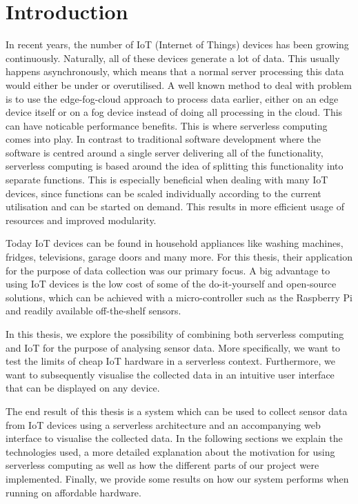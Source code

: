 \chapter{Introduction}
\label{sec:introduction}

In recent years, the number of IoT (Internet of Things) devices has been growing continuously.
Naturally, all of these devices generate a lot of data. This usually happens asynchronously, which
means that a normal server processing this data would either be under or overutilised. A well known
method to deal with problem is to use the edge-fog-cloud approach to process data earlier, either on
an edge device itself or on a fog device instead of doing all processing in the cloud. This can have
noticable performance benefits. This is where serverless computing comes into play. In contrast to
traditional software development where the software is centred around a single server delivering all
of the functionality, serverless computing is based around the idea of splitting this functionality
into separate functions. This is especially beneficial when dealing with many IoT devices, since
functions can be scaled individually according to the current utilisation and can be started on
demand. This results in more efficient usage of resources and improved modularity.

Today IoT devices can be found in household appliances like washing machines, fridges, televisions,
garage doors and many more. For this thesis, their application for the purpose of data collection
was our primary focus. A big advantage to using IoT devices is the low cost of some of the
do-it-yourself and open-source solutions, which can be achieved with a micro-controller such as the
Raspberry Pi and readily available off-the-shelf sensors.

In this thesis, we explore the possibility of combining both serverless computing and IoT for the
purpose of analysing sensor data. More specifically, we want to test the limits of cheap IoT
hardware in a serverless context. Furthermore, we want to subsequently visualise the collected data
in an intuitive user interface that can be displayed on any device.

The end result of this thesis is a system which can be used to collect sensor data from IoT devices
using a serverless architecture and an accompanying web interface to visualise the collected data.
In the following sections we explain the technologies used, a more detailed explanation about the
motivation for using serverless computing as well as how the different parts of our project were
implemented. Finally, we provide some results on how our system performs when running on affordable
hardware.
